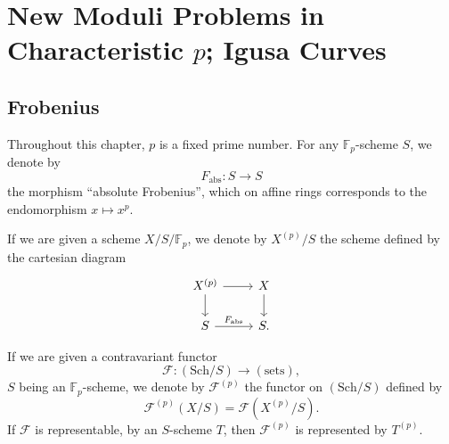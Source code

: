 \chapter{New Moduli Problems in Characteristic \texorpdfstring{$p$}{p}; Igusa Curves}
\label{ch:12}

\section{Frobenius}
\label{sec:12.1}

\kmitem\label{item:12.1.0}
Throughout this chapter, $p$ is a fixed prime number. For any $\mathbb{F}_p$-scheme $S$, we denote by
\begin{equation}\label{eq:12.1.1}
F_{\mathrm{abs}} : S \to S
\end{equation}
the morphism ``absolute Frobenius'', which on affine rings corresponds to the endomorphism $x \mapsto x^p$.

If we are given a scheme $X/S/\mathbb{F}_p$, we denote by $X^{(p)}/S$ the scheme defined by the cartesian diagram
\begin{equation}\label{eq:12.1.2}
\begin{tikzcd}
X^{(p)} \arrow[r] \arrow[d] & X \arrow[d] \\
S \arrow[r, "F_{\mathrm{abs}}"] & S .
\end{tikzcd}
\end{equation}

If we are given a contravariant functor
\begin{equation}\label{eq:12.1.3}
\mathcal{F} : (\mathrm{Sch}/S) \to (\mathrm{sets}) ,
\end{equation}
$S$ being an $\mathbb{F}_p$-scheme, we denote by $\mathcal{F}^{(p)}$ the functor on $(\mathrm{Sch}/S)$ defined by
\begin{equation}\label{eq:12.1.4}
\mathcal{F}^{(p)}(X/S) = \mathcal{F}(X^{(p)}/S) .
\end{equation}
If $\mathcal{F}$ is representable, by an $S$-scheme $T$, then $\mathcal{F}^{(p)}$ is represented by $T^{(p)}$.

